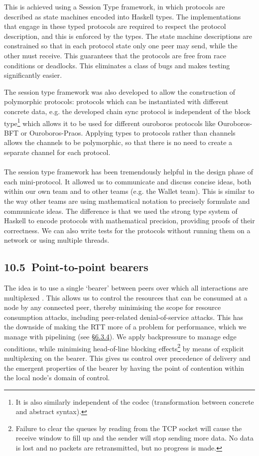 \documentclass[]{article}
\begin{document}
This is achieved using a Session Type framework, in which protocols are
described as state machines encoded into Haskell types. The
implementations that engage in these typed protocols are required to
respect the protocol description, and this is enforced by the types. The
state machine descriptions are constrained so that in each protocol
state only one peer may send, while the other must receive. This
guarantees that the protocols are free from race conditions or
deadlocks. This eliminates a class of bugs and makes testing
significantly easier.

The session type framework was also developed to allow the construction
of polymorphic protocols: protocols which can be instantiated with
different concrete data, e.g. the developed chain sync protocol is
independent of the block type\footnote{It is also similarly independent
  of the codec (transformation between concrete and abstract syntax).}
which allows it to be used for different ouroboros protocols like
Ouroboros-BFT or Ouroboros-Praos. Applying types to protocols rather
than channels allows the channels to be polymorphic, so that there is no
need to create a separate channel for each protocol.\\
~\\
The session type framework has been tremendously helpful in the design
phase of each mini-protocol. It allowed us to communicate and discuss
concise ideas, both within our own team and to other teams (e.g. the
Wallet team). This is similar to the way other teams are using
mathematical notation to precisely formulate and communicate ideas. The
difference is that we used the strong type system of Haskell to encode
protocols with mathematical precision, providing proofs of their
correctness. We can also write tests for the protocols without running
them on a network or using multiple threads.

\hypertarget{point-to-point-bearers}{%
\subsection{​10.5​~Point-to-point
bearers}\label{point-to-point-bearers}}

The idea is to use a single `bearer' between peers over which all
interactions are multiplexed . This allows us to control the resources
that can be consumed at a node by any connected peer, thereby minimising
the scope for resource consumption attacks, including peer-related
denial-of-service attacks. This has the downside of making the RTT more
of a problem for performance, which we manage with pipelining (see
\protect\hyperlink{performance}{{§6.3.4}}). We apply backpressure to
manage edge conditions, while minimising head-of-line blocking
effects\footnote{Failure to clear the queues by reading from the TCP
  socket will cause the receive window to fill up and the sender will
  stop sending more data. No data is lost and no packets are
  retransmitted, but no progress is made.} by means of explicit
multiplexing on the bearer. This gives us control over precedence of
delivery and the emergent properties of the bearer by having the point
of contention within the local node's domain of control.
\end{document}
